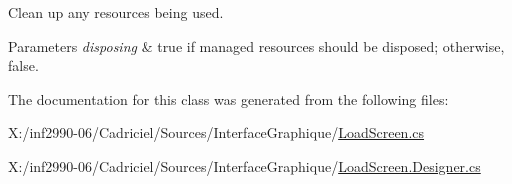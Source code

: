 Clean up any resources being used. 


\begin{DoxyParams}{Parameters}
{\em disposing} & true if managed resources should be disposed; otherwise, false.\\
\hline
\end{DoxyParams}


The documentation for this class was generated from the following files\-:\begin{DoxyCompactItemize}
\item 
X\-:/inf2990-\/06/\-Cadriciel/\-Sources/\-Interface\-Graphique/\hyperlink{_load_screen_8cs}{Load\-Screen.\-cs}\item 
X\-:/inf2990-\/06/\-Cadriciel/\-Sources/\-Interface\-Graphique/\hyperlink{_load_screen_8_designer_8cs}{Load\-Screen.\-Designer.\-cs}\end{DoxyCompactItemize}
